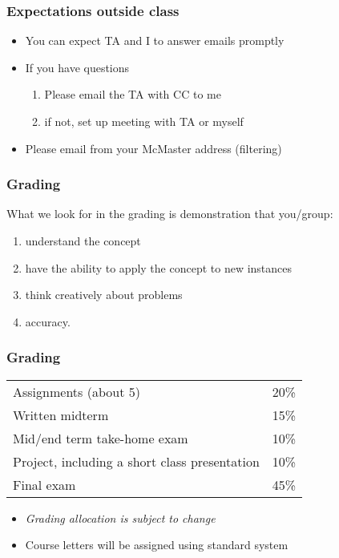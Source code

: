 \begin{frame}\frametitle{Expectations outside class}
	\begin{itemize}
		\item	You can expect TA and I to answer emails promptly
		\item	If you have questions
			\begin{enumerate}
				\item	Please email the TA with CC to me \hfill {\tiny{\color{myOrange}{$\longleftarrow$ hopefully this solves your problem}}}
				\item	if not, set up meeting with TA or myself
			\end{enumerate}
		\item	Please email from your McMaster address (filtering)
	\end{itemize}
\end{frame}

\begin{frame}\frametitle{Grading}
	What we look for in the grading is demonstration that you/group:
	\begin{enumerate}
		\item	understand the concept
		\item	have the ability to apply the concept to new instances
		\item	think creatively about problems
		\item	accuracy.
	\end{enumerate}
\end{frame}

\begin{frame}\frametitle{Grading}
	\begin{tabular}{ll}\\
		Assignments (about 5)       	& 20\% \\
	    Written midterm        			& 15\% \\
	    Mid/end term take-home exam		& 10\% \\
	    Project, including a short class presentation& 10\% \\
	    Final exam 						& 45\% \\
	\end{tabular}
	
	\vspace{12pt}
	\vspace{12pt}
	
	\begin{itemize}
		\item	\emph{Grading allocation is subject to change}
		\item	Course letters will be assigned using standard system
	\end{itemize}
\end{frame}


